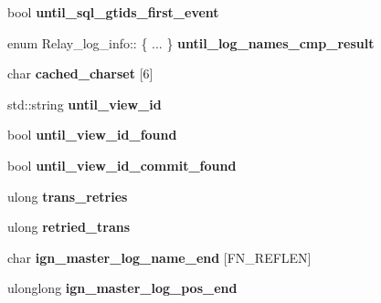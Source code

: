 \begin{DoxyCompactItemize}
\item 
\mbox{\label{classRelay__log__info_af06dba56f6c8298f3f9d654f78100f5b}} 
bool {\bfseries until\+\_\+sql\+\_\+gtids\+\_\+first\+\_\+event}
\item 
\mbox{\label{classRelay__log__info_ad43b7c0407d95f5b212be73583117075}} 
enum Relay\+\_\+log\+\_\+info\+:: \{ ... \}  {\bfseries until\+\_\+log\+\_\+names\+\_\+cmp\+\_\+result}
\item 
\mbox{\label{classRelay__log__info_a09d882fa76f973f2f1fbbaa54591ba6a}} 
char {\bfseries cached\+\_\+charset} \mbox{[}6\mbox{]}
\item 
\mbox{\label{classRelay__log__info_ad339874393dcb56089d2234a8ecbca76}} 
std\+::string {\bfseries until\+\_\+view\+\_\+id}
\item 
\mbox{\label{classRelay__log__info_ab4168d1ccb1714a10f91560e36e5be14}} 
bool {\bfseries until\+\_\+view\+\_\+id\+\_\+found}
\item 
\mbox{\label{classRelay__log__info_a3a796d29dc339fa097fcd2c8431c628f}} 
bool {\bfseries until\+\_\+view\+\_\+id\+\_\+commit\+\_\+found}
\item 
\mbox{\label{classRelay__log__info_a40e9c968385774492b3be06a7e9ddf5e}} 
ulong {\bfseries trans\+\_\+retries}
\item 
\mbox{\label{classRelay__log__info_a29a7bbe8eabee8d7dd39fd89362f514f}} 
ulong {\bfseries retried\+\_\+trans}
\item 
\mbox{\label{classRelay__log__info_a33453c86931cbd5f409b89fdb8325be2}} 
char {\bfseries ign\+\_\+master\+\_\+log\+\_\+name\+\_\+end} \mbox{[}F\+N\+\_\+\+R\+E\+F\+L\+EN\mbox{]}
\item 
\mbox{\label{classRelay__log__info_a39e125483b40b8a6d8a3fbf49a431582}} 
ulonglong {\bfseries ign\+\_\+master\+\_\+log\+\_\+pos\+\_\+end}
\item 
\mbox{\label{classRelay__log__info_ad59dffb0eae5b9eeb2e116a811eb696e}} 

\end{DoxyCompactItemize}
